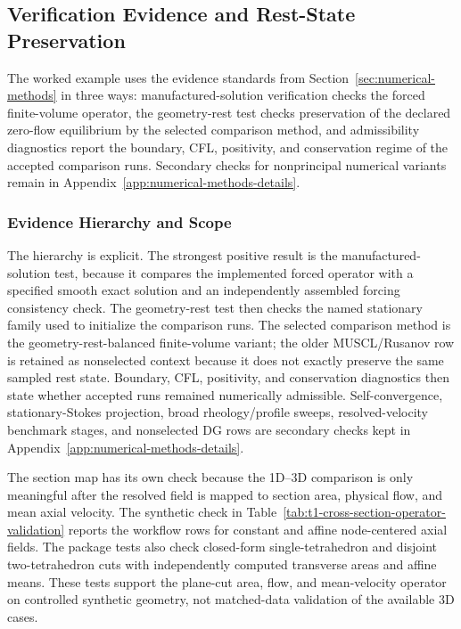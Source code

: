 \subsection{Verification Evidence and Rest-State Preservation}
\label{sec:numerical-verification}

The worked example uses the evidence standards from
Section~\ref{sec:numerical-methods} in three ways: manufactured-solution
verification checks the forced finite-volume operator, the geometry-rest test
checks preservation of the declared zero-flow equilibrium by the selected
comparison method, and admissibility diagnostics report the boundary, CFL,
positivity, and conservation regime of the accepted comparison runs. Secondary
checks for nonprincipal numerical variants remain in
Appendix~\ref{app:numerical-methods-details}.

\subsubsection{Evidence Hierarchy and Scope}
\label{subsec:verification-scope-convergence-stability}

The hierarchy is explicit. The strongest positive result is the
manufactured-solution test, because it compares the implemented forced operator
with a specified smooth exact solution and an independently assembled forcing
consistency check. The geometry-rest test then checks the named stationary
family used to initialize the comparison runs. The selected comparison method is
the geometry-rest-balanced finite-volume variant; the older MUSCL/Rusanov row
is retained as nonselected context because it does not exactly preserve the same
sampled rest state. Boundary, CFL, positivity, and conservation diagnostics then
state whether accepted runs remained numerically admissible. Self-convergence,
stationary-Stokes projection, broad rheology/profile sweeps, resolved-velocity
benchmark stages, and nonselected DG rows are secondary checks kept in
Appendix~\ref{app:numerical-methods-details}.

The section map has its own check because the 1D--3D comparison is only
meaningful after the resolved field is mapped to section area, physical flow,
and mean axial velocity. The synthetic check in
Table~\ref{tab:t1-cross-section-operator-validation} reports the workflow rows
for constant and affine node-centered axial fields. The package tests also check
closed-form single-tetrahedron and disjoint two-tetrahedron cuts with
independently computed transverse areas and affine means. These tests support
the plane-cut area, flow, and mean-velocity operator on controlled synthetic
geometry, not matched-data validation of the available 3D cases.

